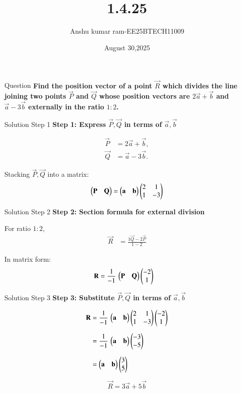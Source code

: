 \documentclass{beamer}
\title %
{1.4.25}
\date{August 30,2025}
\author %
{Anshu kumar ram-EE25BTECH11009}
\begin{document}
\frame{\titlepage}
\begin{frame}{Question}
\textbf{Find the position vector of a point $\vec{R}$ which divides the line joining two points $\vec{P}$ and $\vec{Q}$ whose position vectors are $2\vec{a} + \vec{b}$ and $\vec{a} - 3\vec{b}$ externally in the ratio $1:2$.}
\end{frame}

\begin{frame}{Solution Step 1}
\textbf{Step 1: Express $\vec{P}, \vec{Q}$ in terms of $\vec{a}, \vec{b}$}  

\begin{align}
\vec{P} &= 2\vec{a} + \vec{b}, \label{eq:P}\\
\vec{Q} &= \vec{a} - 3\vec{b}. \label{eq:Q}
\end{align}

Stacking $\vec{P}, \vec{Q}$ into a matrix:
\begin{align}
\begin{pmatrix}\mathbf{P} & \mathbf{Q}\end{pmatrix}
= \begin{pmatrix}\mathbf{a} & \mathbf{b}\end{pmatrix}
  \begin{pmatrix}2 & 1 \\ 1 & -3\end{pmatrix}
\label{eq:PQ-matrix}
\end{align}
\end{frame}

\begin{frame}{Solution Step 2}
\textbf{Step 2: Section formula for external division}  

For ratio $1:2$,  
\begin{align}
\vec{R} &= \frac{1\vec{Q} - 2\vec{P}}{1-2} \label{eq:section}
\end{align}

In matrix form:
\begin{align}
\mathbf{R} &= \frac{1}{-1}\,\begin{pmatrix}\mathbf{P} & \mathbf{Q}\end{pmatrix}\begin{pmatrix}-2 \\ 1\end{pmatrix}
\label{eq:R-matrix}
\end{align}
\end{frame}

\begin{frame}{Solution Step 3}
\textbf{Step 3: Substitute $\vec{P}, \vec{Q}$ in terms of $\vec{a}, \vec{b}$}  

\begin{align}
\mathbf{R}
&= \frac{1}{-1}\,
   \begin{pmatrix}\mathbf{a} & \mathbf{b}\end{pmatrix}
   \begin{pmatrix}2 & 1 \\ 1 & -3\end{pmatrix}
   \begin{pmatrix}-2 \\ 1\end{pmatrix} \label{eq:R-sub1} \\[6pt]
&= \frac{1}{-1}\,
   \begin{pmatrix}\mathbf{a} & \mathbf{b}\end{pmatrix}
   \begin{pmatrix}-3 \\ -5\end{pmatrix} \label{eq:R-sub2} \\[6pt]
&= \begin{pmatrix}\mathbf{a} & \mathbf{b}\end{pmatrix}
   \begin{pmatrix}3 \\ 5\end{pmatrix} \label{eq:R-final}
\end{align}

\[
\boxed{\vec{R} = 3\vec{a} + 5\vec{b}}
\]
\end{frame}
\end{document}
